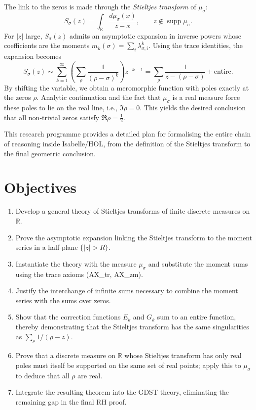 \documentclass[12pt,a4paper]{article}
\begin{document}
The link to the zeros is made through the \emph{Stieltjes transform} of $\mu_\sigma$:
\[
S_\sigma(z) = \int_{\mathbb{R}} \frac{d\mu_\sigma(x)}{z - x}, \qquad z \notin \operatorname{supp}\mu_\sigma.
\]
For $|z|$ large, $S_\sigma(z)$ admits an asymptotic expansion in inverse powers whose 
coefficients are the moments $m_k(\sigma) = \sum_i \lambda_{\sigma,i}^k$.  Using the 
trace identities, the expansion becomes
\[
S_\sigma(z) \sim \sum_{k=1}^\infty \left( \sum_{\rho} \frac{1}{(\rho-\sigma)^k} \right) z^{-k-1}
= \sum_{\rho} \frac{1}{z - (\rho-\sigma)} + \text{entire}.
\]
By shifting the variable, we obtain a meromorphic function with poles exactly at the 
zeros $\rho$.  Analytic continuation and the fact that $\mu_\sigma$ is a real measure 
force these poles to lie on the real line, i.e., $\Im \rho = 0$.  This yields the 
desired conclusion that all non‑trivial zeros satisfy $\Re \rho = \frac12$.

This research programme provides a detailed plan for formalising the entire chain of 
reasoning inside Isabelle/HOL, from the definition of the Stieltjes transform to the 
final geometric conclusion.

\section{Objectives}
\begin{enumerate}[label=(\arabic*)]
    \item Develop a general theory of Stieltjes transforms of finite discrete measures 
          on $\mathbb{R}$.
    \item Prove the asymptotic expansion linking the Stieltjes transform to the 
          moment series in a half‑plane $\{|z| > R\}$.
    \item Instantiate the theory with the measure $\mu_\sigma$ and substitute the 
          moment sums using the trace axioms (AX\_tr, AX\_zm).
    \item Justify the interchange of infinite sums necessary to combine the moment 
          series with the sums over zeros.
    \item Show that the correction functions $E_k$ and $G_k$ sum to an entire function, 
          thereby demonstrating that the Stieltjes transform has the same singularities 
          as $\sum_\rho 1/(\rho - z)$.
    \item Prove that a discrete measure on $\mathbb{R}$ whose Stieltjes transform has 
          only real poles must itself be supported on the same set of real points; 
          apply this to $\mu_\sigma$ to deduce that all $\rho$ are real.
    \item Integrate the resulting theorem into the GDST theory, eliminating the 
          remaining gap in the final RH proof.
\end{enumerate}
\end{document}
